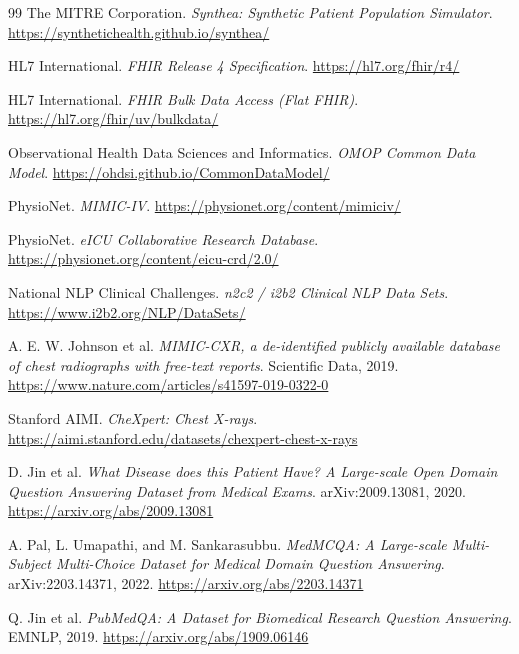 \begin{thebibliography}{99}
The MITRE Corporation.
\newblock \textit{Synthea: Synthetic Patient Population Simulator}.
\newblock \url{https://synthetichealth.github.io/synthea/}

HL7 International.
\newblock \textit{FHIR Release 4 Specification}.
\newblock \url{https://hl7.org/fhir/r4/}

HL7 International.
\newblock \textit{FHIR Bulk Data Access (Flat FHIR)}.
\newblock \url{https://hl7.org/fhir/uv/bulkdata/}

Observational Health Data Sciences and Informatics.
\newblock \textit{OMOP Common Data Model}.
\newblock \url{https://ohdsi.github.io/CommonDataModel/}

PhysioNet.
\newblock \textit{MIMIC-IV}.
\newblock \url{https://physionet.org/content/mimiciv/}

PhysioNet.
\newblock \textit{eICU Collaborative Research Database}.
\newblock \url{https://physionet.org/content/eicu-crd/2.0/}

National NLP Clinical Challenges.
\newblock \textit{n2c2 / i2b2 Clinical NLP Data Sets}.
\newblock \url{https://www.i2b2.org/NLP/DataSets/}

A. E. W. Johnson et al.
\newblock \textit{MIMIC-CXR, a de-identified publicly available database of chest radiographs with free-text reports}.
\newblock Scientific Data, 2019.
\newblock \url{https://www.nature.com/articles/s41597-019-0322-0}

Stanford AIMI.
\newblock \textit{CheXpert: Chest X-rays}.
\newblock \url{https://aimi.stanford.edu/datasets/chexpert-chest-x-rays}

D. Jin et al.
\newblock \textit{What Disease does this Patient Have? A Large-scale Open Domain Question Answering Dataset from Medical Exams}.
\newblock arXiv:2009.13081, 2020.
\newblock \url{https://arxiv.org/abs/2009.13081}

A. Pal, L. Umapathi, and M. Sankarasubbu.
\newblock \textit{MedMCQA: A Large-scale Multi-Subject Multi-Choice Dataset for Medical Domain Question Answering}.
\newblock arXiv:2203.14371, 2022.
\newblock \url{https://arxiv.org/abs/2203.14371}

Q. Jin et al.
\newblock \textit{PubMedQA: A Dataset for Biomedical Research Question Answering}.
\newblock EMNLP, 2019.
\newblock \url{https://arxiv.org/abs/1909.06146}


\end{thebibliography}
